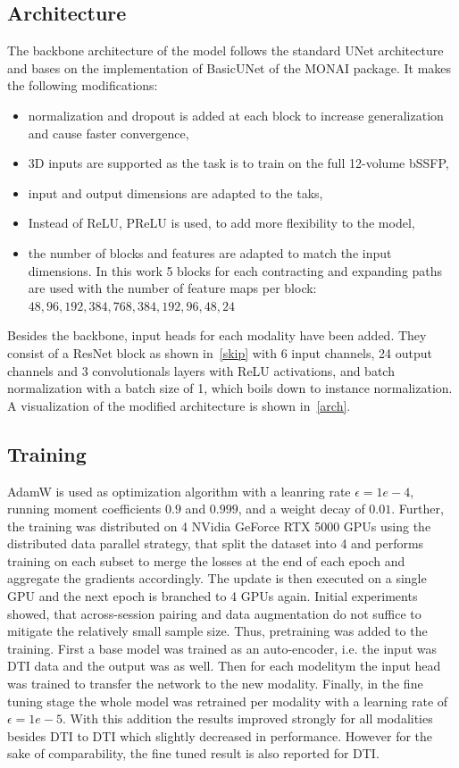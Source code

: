 \subsection{Architecture}
The backbone architecture of the model follows the standard UNet architecture and bases on the implementation of BasicUNet of the MONAI package.
It makes the following modifications:
\begin{itemize}
 \item normalization and dropout is added at each block to increase generalization and cause faster convergence,
 \item 3D inputs are supported as the task is to train on the full 12-volume bSSFP,
 \item input and output dimensions are adapted to the taks,
 \item Instead of ReLU, PReLU is used, to add more flexibility to the model,
 \item the number of blocks and features are adapted to match the input dimensions. In this work 5 blocks for each contracting and expanding paths are used with the number of feature maps per block: $48, 96, 192, 384, 768, 384, 192, 96, 48, 24$
\end{itemize}
Besides the backbone, input heads for each modality have been added.
They consist of a ResNet block as shown in~\ref{skip} with 6 input channels, 24 output channels and 3 convolutionals layers with ReLU activations, and batch normalization with a batch size of 1, which boils down to instance normalization.
A visualization of the modified architecture is shown in~\ref{arch}.

\subsection{Training}
AdamW is used as optimization algorithm with a leanring rate $\epsilon=1e-4$, running moment coefficients $0.9$ and $0.999$, and a weight decay of $0.01$.
Further, the training was distributed on 4 NVidia GeForce RTX 5000 GPUs using the distributed data parallel strategy, that split the dataset into 4 and performs training on each subset to merge the losses at the end of each epoch and aggregate the gradients accordingly.
The update is then executed on a single GPU and the next epoch is branched to 4 GPUs again.
Initial experiments showed, that across-session pairing and data augmentation do not suffice to mitigate the relatively small sample size.
Thus, pretraining was added to the training.
First a base model was trained as an auto-encoder, i.e. the input was DTI data and the output was as well.
Then for each modelitym the input head was trained to transfer the network to the new modality.
Finally, in the fine tuning stage the whole model was retrained per modality with a learning rate of $\epsilon=1e-5$.
With this addition the results improved strongly for all modalities besides DTI to DTI which slightly decreased in performance.
However for the sake of comparability, the fine tuned result is also reported for DTI.
